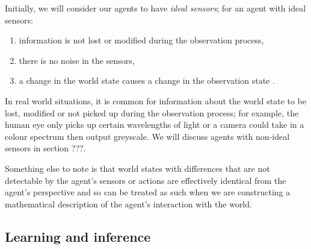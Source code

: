 Initially, we will consider our agents to have \emph{ideal sensors}; for an agent with ideal sensors:
\begin{enumerate}[(1)]
    \item information is not lost or modified during the observation process,
    \item there is no noise in the sensors,
    \item a change in the world state causes a change in the observation state  .
\end{enumerate}

In real world situations, it is common for information about the world state to be lost, modified or not picked up during the observation process; for example, the human eye only picks up certain wavelengths of light or a camera could take in a colour spectrum then output greyscale.
We will discuss agents with non-ideal sensors in section ???.

Something else to note is that world states with differences that are not detectable by the agent's sensors or actions are effectively identical from the agent's perspective and so can be treated as such when we are constructing a mathematical description of the agent's interaction with the world.

\subsection{Learning and inference}

